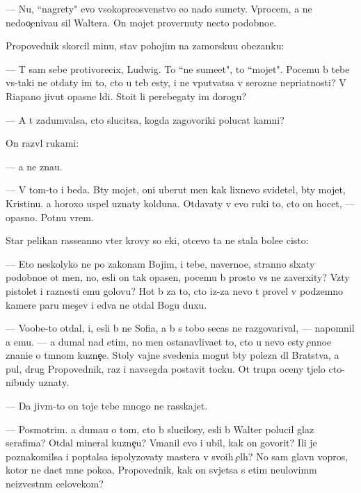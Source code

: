 \documentclass[10pt]{book}
\begin{document}
— Nu, ``nagrety" {\y}evo v{\yi}sokopreosv{\ia}{\x}enstvo {\y}e{\x}o nado sumety. Vprocem, {\y}a ne nedoo{\c}eniva{\y}u sil{\yi} Waltera. On mojet provernuty necto podobno{\y}e.

Propovednik skorcil minu, stav pohojim na zamorsku{\y}u obez{\y}anku:

— T{\yi} sam sebe protivorecix, Ludwig. To ``ne sume{\y}et", to ``mojet". Pocemu b{\yi} tebe vs{\e}-taki ne otdaty im to, cto u teb{\ia} {\y}esty, i ne vput{\yi}vatsa v ser{\y}ozn{\yi}{\y}e nepri{\y}atnosti? V Riapano jivut opasn{\yi}{\y}e l{\iu}di. Sto{\y}it li perebegaty im dorogu?

— A t{\yi} zadum{\yi}valsa, cto slucitsa, kogda zagovor{\x}iki polucat kamni?

On razv{\e}l rukami:

— {\Y}a ne zna{\y}u.

— V tom-to i beda. B{\yi}ty mojet, oni uberut men{\ia} kak lixnevo svidetel{\ia}, b{\yi}ty mojet, Kristinu. {\Y}a horoxo uspel uznaty kolduna. Otdavaty v {\y}evo ruki to, cto on hocet, — opasno. Pot{\ia}nu vrem{\ia}.

Star{\yi}{\y} pelikan rasse{\y}anno v{\yi}ter krovy so {\x}eki, otcevo ta ne stala bole{\y}e cisto{\y}:

— Eto neskolyko ne po zakonam Boj{\yf}im, i tebe, naverno{\y}e, stranno sl{\yi}xaty podobno{\y}e ot men{\ia}, no, {\y}esli on tak opasen, pocemu b{\yi} prosto vs{\e} ne zaverxity? Vz{\ia}ty pistolet i raznesti {\y}emu golovu? Hot{\ia} b{\yi} za to, cto iz-za nevo t{\yi} provel v podzemno{\y} kamere paru mes{\ia}{\c}ev i {\y}edva ne otdal Bogu duxu.

— Voob{\x}e-to otdal, i, {\y}esli b{\yi} ne Sofi{\y}a, {\y}a b{\yi} s tobo{\y} se{\y}cas ne razgovarival, — napomnil {\y}a {\y}emu. — {\Y}a dumal nad etim, no men{\ia} ostanavliva{\y}et to, cto u nevo {\y}esty {\c}enno{\y}e znani{\y}e o t{\e}mnom kuzne{\c}e. Stoly vajn{\yi}{\y}e svedeni{\y}a mogut b{\yi}ty polezn{\yi} dl{\ia} Bratstva, a pul{\ia}, drug Propovednik, raz i navsegda postavit tocku. Ot trupa oceny t{\ia}jelo cto-nibudy uznaty.

— Da jiv{\yi}m-to on toje tebe mnogo ne rasskajet.

— Posmotrim. {\Y}a duma{\y}u o tom, cto b{\yi} slucilosy, {\y}esli b{\yi} Walter polucil glaz serafima? Otdal mineral kuzne{\c}u? V{\yi}manil {\y}evo i ubil, kak on govorit? Ili je poznakomilsa i pop{\yi}talsa ispolyzovaty mastera v svo{\y}ih {\c}el{\ia}h? No sam{\yi}{\y} glavn{\yi}{\y} vopros, kotor{\yi}{\y} ne da{\y}et mne poko{\y}a, Propovednik, kak on sv{\ia}jetsa s etim neulovim{\yi}m ne{\y}izvestn{\yi}m celovekom?
\end{document}
